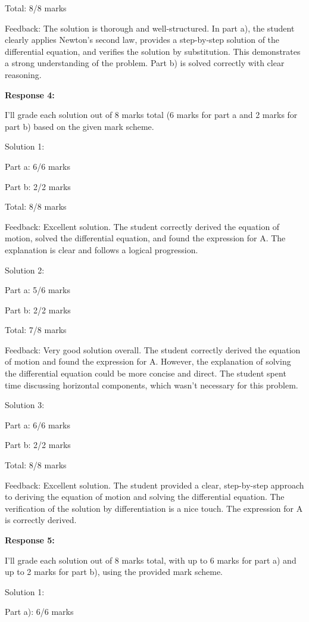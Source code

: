 \documentclass[a4paper,11pt]{article}
\begin{document}
Total: 8/8 marks

Feedback: The solution is thorough and well-structured. In part a), the student clearly applies Newton's second law, provides a step-by-step solution of the differential equation, and verifies the solution by substitution. This demonstrates a strong understanding of the problem. Part b) is solved correctly with clear reasoning.

\bigskip
\textbf{Response 4:}

I'll grade each solution out of 8 marks total (6 marks for part a and 2 marks for part b) based on the given mark scheme.

Solution 1:

Part a: 6/6 marks

Part b: 2/2 marks

Total: 8/8 marks

Feedback: Excellent solution. The student correctly derived the equation of motion, solved the differential equation, and found the expression for A. The explanation is clear and follows a logical progression.

Solution 2:

Part a: 5/6 marks

Part b: 2/2 marks

Total: 7/8 marks

Feedback: Very good solution overall. The student correctly derived the equation of motion and found the expression for A. However, the explanation of solving the differential equation could be more concise and direct. The student spent time discussing horizontal components, which wasn't necessary for this problem.

Solution 3:

Part a: 6/6 marks

Part b: 2/2 marks

Total: 8/8 marks

Feedback: Excellent solution. The student provided a clear, step-by-step approach to deriving the equation of motion and solving the differential equation. The verification of the solution by differentiation is a nice touch. The expression for A is correctly derived.

\bigskip
\textbf{Response 5:}

I'll grade each solution out of 8 marks total, with up to 6 marks for part a) and up to 2 marks for part b), using the provided mark scheme.

Solution 1:

Part a): 6/6 marks
\end{document}
